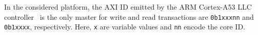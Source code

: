 In the considered platform, the AXI ID emitted by the ARM Cortex-A53
LLC controller~\cite{ARM-cortex-A53} is the only master for write and
read transactions are \verb|0b1xxxnn| and \verb|0b1xxxx|,
respectively. Here, \verb|x| are variable values and \verb|nn| encode
the core ID. 



